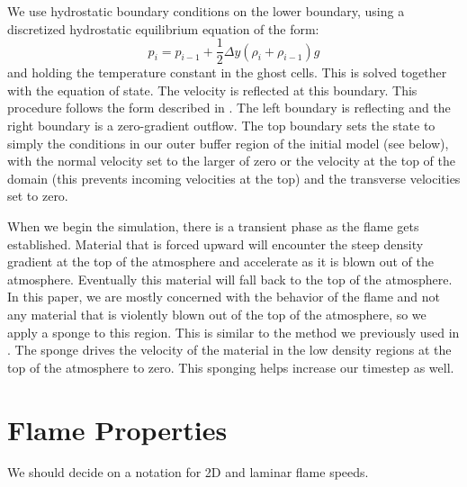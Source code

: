 \documentclass[preprint,times,tighten]{aastex63}
\newcommand{\MarginPar}[1]{
    \marginpar{\vskip-\baselineskip%
               \raggedright%
               \tiny\sffamily%
               {\color{red}\hrule%
               \smallskip%
               #1\par%
               \smallskip%
               \hrule}}%
}
\begin{document}
We use hydrostatic boundary conditions on the lower boundary, using
a discretized hydrostatic equilibrium equation of the form:
\begin{equation}
\label{eq:hse}
p_i = p_{i-1} + \frac{1}{2} \Delta y (\rho_i + \rho_{i-1}) g
\end{equation}
and holding the temperature constant in the ghost cells.  This is solved
together with the equation of state.  The velocity is reflected at this boundary.
This procedure follows the form described in \citet{ppm-hse}.  The
left boundary is reflecting and the right boundary is a zero-gradient
outflow.  The top boundary sets the state to simply the conditions
in our outer buffer region of the initial model (see below), with the
normal velocity set to the larger of zero or the velocity at the top
of the domain (this prevents incoming velocities at the top) and the
transverse velocities set to zero.

When we begin the simulation, there is a transient phase as the flame
gets established.  Material that is forced upward will encounter the
steep density gradient at the top of the atmosphere and accelerate as
it is blown out of the atmosphere.  Eventually this material will fall
back to the top of the atmosphere.  In this paper, we are mostly
concerned with the behavior of the flame and not any material that is
violently blown out of the top of the atmosphere, so we apply a sponge
to this region.  This is similar to the method we previously used in \cite{xrb3d}.
The sponge drives the velocity of the material in the low
density \MarginPar{add mathematical form of sponge} regions at the top
of the atmosphere to zero.  This sponging helps increase our timestep
as well.


\section{Flame Properties}\label{Sec:Flame}

{\color{red} We should decide on a notation for 2D and laminar flame speeds.}
\end{document}
